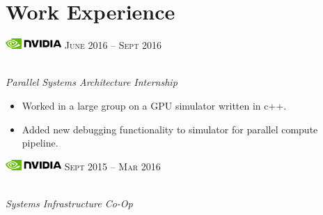 \documentclass[10pt]{article}
\begin{document}
\color{text1} %



\par{
\vspace{0.2cm}
	

\begin{minipage}[t]{0.5\textwidth} %
\vspace{0pt} %


\section{Work Experience} 

\includegraphics[height=0.4cm]{nvidia} \hfill \textsc{June 2016 -- Sept 2016}
{\raggedright\large\\
\textit{Parallel Systems Architecture Internship}\\}

\begin{itemize}
  \setlength\itemsep{0.2mm}
    \item[\ding{226}] Worked in a large group on a GPU simulator written in c++.
    \item[\ding{226}] Added new debugging functionality to simulator for parallel compute pipeline.
\end{itemize}

\includegraphics[height=0.4cm]{nvidia} \hfill \textsc{Sept 2015 -- Mar 2016}
{\raggedright\large\\
\textit{Systems Infrastructure Co-Op}\\} 


\end{minipage}}
\end{document}
